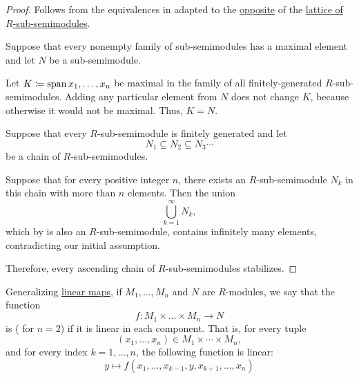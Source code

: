\begin{proof}
   Follows from the equivalences in  adapted to the \hyperref[def:semilattice/duality]{opposite} of the \hyperref[thm:substructures_form_complete_lattice]{lattice of \( R \)-sub-semimodules}.

   Suppose that every nonempty family of sub-semimodules has a maximal element and let \( N \) be a sub-semimodule.

  Let \( K \coloneqq \operatorname{span}{ x_1, \ldots, x_n } \) be maximal in the family of all finitely-generated \( R \)-sub-semimodules. Adding any particular element from \( N \) does not change \( K \), because otherwise it would not be maximal. Thus, \( K = N \).

   Suppose that every \( R \)-sub-semimodule is finitely generated and let
  \begin{equation*}
    N_1 \subseteq N_2 \subseteq N_3 \cdots
  \end{equation*}
  be a chain of \( R \)-sub-semimodules.

  Suppose that for every positive integer \( n \), there exists an \( R \)-sub-semimodule \( N_k \) in this chain with more than \( n \) elements. Then the union
  \begin{equation*}
    \bigcup_{k=1}^\infty N_k,
  \end{equation*}
  which by  is also an \( R \)-sub-semimodule, contains infinitely many elements, contradicting our initial assumption.

  Therefore, every ascending chain of \( R \)-sub-semimodules stabilizes.
\end{proof}

\begin{definition}\label{def:multilinear_function}\mimprovised
  Generalizing \hyperref[def:semimodule/homomorphism]{linear maps}, if \( M_1, \ldots, M_n \) and \( N \) are \( R \)-modules, we say that the function
  \begin{equation*}
    f: M_1 \times \ldots \times M_n \to N
  \end{equation*}
  is  ( for \( n = 2 \)) if it is linear in each component. That is, for every tuple
  \begin{equation*}
    (x_1, \ldots, x_n) \in M_1 \times \cdots \times M_n,
  \end{equation*}
  and for every index \( k = 1, \ldots, n \), the following function is linear:
  \begin{equation*}
    y \mapsto f(x_1, \ldots, x_{k-1}, y, x_{k+1}, \ldots, x_n)
  \end{equation*}
\end{definition}

